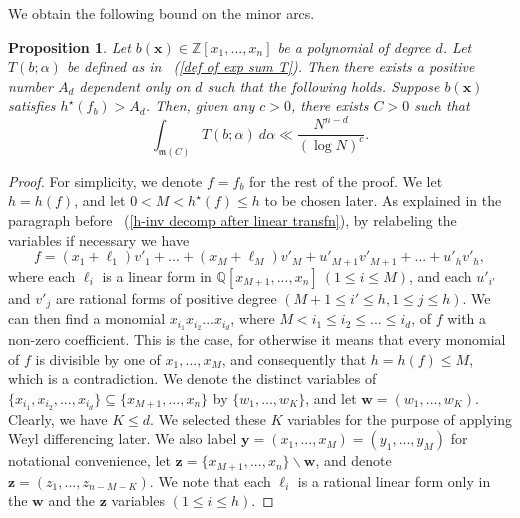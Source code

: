 \documentclass[12pt]{amsart}
\newtheorem{prop}[thm]{Proposition}
\theoremstyle{definition}
\theoremstyle{remark}
\numberwithin{equation}{section}
\begin{document}
We obtain the following bound on the minor arcs.
\begin{prop}
\label{prop minor arc bound}
Let $b(\mathbf{x}) \in \mathbb{Z}[x_1, ..., x_n]$ be a polynomial of degree $d$. Let $T(b; \alpha)$
be defined as in ~(\ref{def of exp sum T}).
Then there exists a positive number $A_d$ dependent only on $d$ such that the following holds. Suppose $b(\mathbf{x})$
satisfies $h^{\star}(f_b) > A_d$.
Then, given any $c>0$, there exists $C>0$ such that
$$
\int_{\mathfrak{m}(C)}  T(b; \alpha)  \ d {\alpha}  
\ll
\frac{N^{n - d } }{(\log N)^{c}}.
$$
\end{prop}
\begin{proof}
For simplicity, we denote $f = f_b$ for the rest of the proof.
We let $h = h(f)$, and let $0 < M < h^{\star}(f) \leq h$ to be chosen later.
As explained in the paragraph before ~(\ref{h-inv decomp after linear transfn}),
by relabeling the variables if necessary we have
$$
f = (x_1 + \ell_1) v'_1 + ... + (x_M + \ell_M) v'_M + u'_{M+1}v'_{M+1} + ... + u'_h v'_h,
$$
where each $\ell_i$ is a linear form in $\mathbb{Q}[x_{M+1}, ..., x_n] \ (1 \leq i \leq M)$,
and each $u'_{i'}$ and $v'_j$ are rational forms of positive degree $(M+1 \leq i' \leq h, 1 \leq j \leq h)$.
We can then find a monomial $x_{i_1}x_{i_2}... x_{i_d}$, where $M < i_1 \leq i_2 \leq ... \leq i_d$, of $f$ with a non-zero coefficient.
This is the case, for otherwise it means that every monomial of $f$ is divisible by one of $x_1, ..., x_M$, and consequently that
$h = h(f)\leq M$, which is a contradiction.
We denote the distinct variables of $\{ x_{i_1}, x_{i_2}, ... , x_{i_d} \} \subseteq \{x_{M+1}, ..., x_n \}$
by $\{w_1, ..., w_K \}$, and let $\mathbf{w} = (w_1, ..., w_K)$. Clearly, we have $K \leq d$.
We selected these $K$ variables for the purpose of applying Weyl differencing later.
We also label $\mathbf{y} = (x_1,..., x_M) = (y_1, ..., y_M)$ for notational convenience,
let $\mathbf{z} = \{ x_{M+1}, ..., x_n \} \backslash \mathbf{w}$, and denote $\mathbf{z} = (z_1, ..., z_{n - M - K})$.
We note that each $\ell_i$ is a rational linear form only in the $\mathbf{w}$ and the $\mathbf{z}$ variables $(1 \leq i \leq h)$.


\end{proof}
\end{document}
